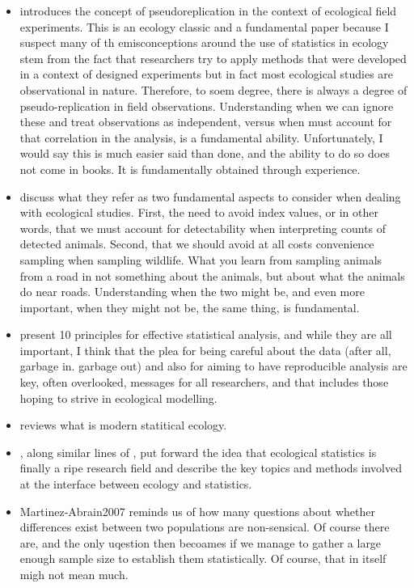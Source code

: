 \documentclass[
]{book}
\begin{document}
\begin{itemize}
\item
  \citet{Hurlbert1984} introduces the concept of pseudoreplication in the context of ecological field experiments. This is an ecology classic and a fundamental paper because I suspect many of th emisconceptions around the use of statistics in ecology stem from the fact that researchers try to apply methods that were developed in a context of designed experiments but in fact most ecological studies are observational in nature. Therefore, to soem degree, there is always a degree of pseudo-replication in field observations. Understanding when we can ignore these and treat observations as independent, versus when must account for that correlation in the analysis, is a fundamental ability. Unfortunately, I would say this is much easier said than done, and the ability to do so does not come in books. It is fundamentally obtained through experience.
\item
  \citet{AND2001} discuss what they refer as two fundamental aspects to consider when dealing with ecological studies. First, the need to avoid index values, or in other words, that we must account for detectability when interpreting counts of detected animals. Second, that we should avoid at all costs convenience sampling when sampling wildlife. What you learn from sampling animals from a road in not something about the animals, but about what the animals do near roads. Understanding when the two might be, and even more important, when they might not be, the same thing, is fundamental.
\item
  \citet{Kass2016} present 10 principles for effective statistical analysis, and while they are all important, I think that the plea for being careful about the data (after all, garbage in. garbage out) and also for aiming to have reproducible analysis are key, often overlooked, messages for all researchers, and that includes those hoping to strive in ecological modelling.
\item
  \citet{King2014} reviews what is modern statitical ecology.
\item
  \citet{Gimenez2014}, along similar lines of \citet{King2014}, put forward the idea that ecological statistics is finally a ripe research field and describe the key topics and methods involved at the interface between ecology and statistics.
\item
  Martinez-Abrain2007 reminds us of how many questions about whether differences exist between two populations are non-sensical. Of course there are, and the only uqestion then becoames if we manage to gather a large enough sample size to establish them statistically. Of course, that in itself migh not mean much.

\end{itemize}
\end{document}
